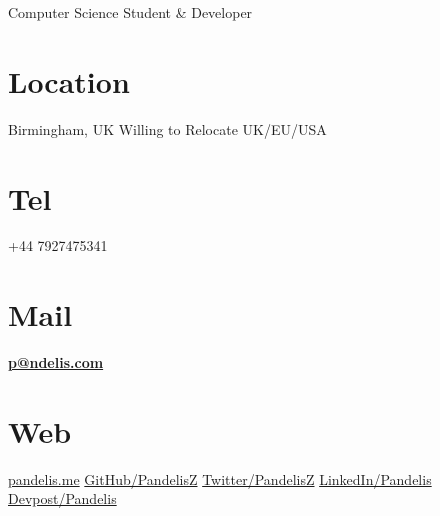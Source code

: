 \documentclass[]{friggeri-cv}
\begin{document}
      {Computer Science Student & Developer}


\begin{aside}
  \section{Location}
    Birmingham, UK
    Willing to Relocate
    UK/EU/USA
    ~
  \section{Tel}
    +44 7927475341
    ~
  \section{Mail}
    \href{mailto:p@ndelis.com}{\textbf{p@ndelis.com}}
    ~
  \section{Web}
    \href{http://pandelis.me}{pandelis.me}
    \href{https://github.com/pandelisz}{GitHub/PandelisZ}
    \href{https://twitter.com/pandelisz}{Twitter/PandelisZ}
    \href{https://linkedin.com/in/pandelis}{LinkedIn/Pandelis}
    \href{https://devpost.com/pandelis}{Devpost/Pandelis}
    ~

\end{aside}
\end{document}
